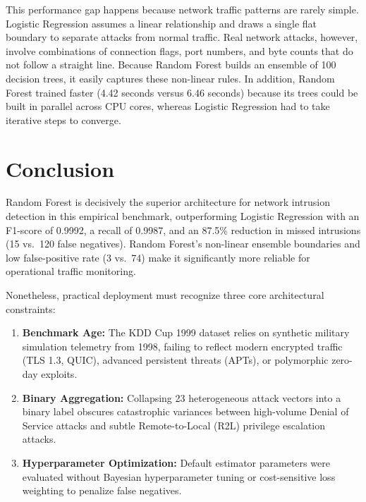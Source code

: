 \documentclass[12pt,a4paper]{article}
\begin{document}
This performance gap happens because network traffic patterns are rarely simple. Logistic Regression assumes a linear relationship and draws a single flat boundary to separate attacks from normal traffic. Real network attacks, however, involve combinations of connection flags, port numbers, and byte counts that do not follow a straight line. Because Random Forest builds an ensemble of 100 decision trees, it easily captures these non-linear rules. In addition, Random Forest trained faster (4.42 seconds versus 6.46 seconds) because its trees could be built in parallel across CPU cores, whereas Logistic Regression had to take iterative steps to converge.

\section{Conclusion}
Random Forest is decisively the superior architecture for network intrusion detection in this empirical benchmark, outperforming Logistic Regression with an F1-score of 0.9992, a recall of 0.9987, and an 87.5\% reduction in missed intrusions (15 vs.\ 120 false negatives). Random Forest's non-linear ensemble boundaries and low false-positive rate (3 vs.\ 74) make it significantly more reliable for operational traffic monitoring. 

Nonetheless, practical deployment must recognize three core architectural constraints:
\begin{enumerate}
  \item \textbf{Benchmark Age:} The KDD Cup 1999 dataset relies on synthetic military simulation telemetry from 1998, failing to reflect modern encrypted traffic (TLS 1.3, QUIC), advanced persistent threats (APTs), or polymorphic zero-day exploits.
  \item \textbf{Binary Aggregation:} Collapsing 23 heterogeneous attack vectors into a binary label obscures catastrophic variances between high-volume Denial of Service attacks and subtle Remote-to-Local (R2L) privilege escalation attacks.
  \item \textbf{Hyperparameter Optimization:} Default estimator parameters were evaluated without Bayesian hyperparameter tuning or cost-sensitive loss weighting to penalize false negatives.
\end{enumerate}

\end{document}
